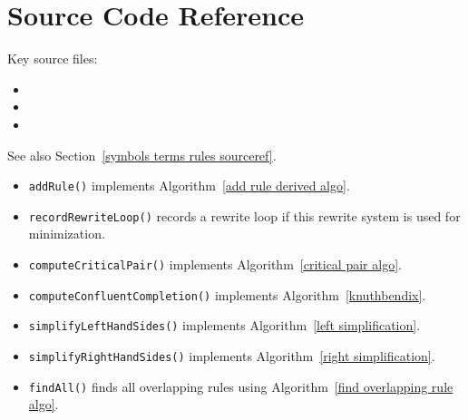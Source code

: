 \documentclass[../generics]{subfiles}
\begin{document}
\section{Source Code Reference}\label{completion sourceref}

Key source files:
\begin{itemize}
\item {}
\item {}
\item {}
\end{itemize}

See also Section~\ref{symbols terms rules sourceref}.
\begin{itemize}
\item \texttt{addRule()} implements Algorithm~\ref{add rule derived algo}.
\item \texttt{recordRewriteLoop()} records a rewrite loop if this rewrite system is used for minimization.
\item {}\texttt{computeCriticalPair()} implements Algorithm~\ref{critical pair algo}.
\item {}\texttt{computeConfluentCompletion()} implements Algorithm~\ref{knuthbendix}.
\item \texttt{simplifyLeftHandSides()} implements Algorithm~\ref{left simplification}.
\item \texttt{simplifyRightHandSides()} implements Algorithm~\ref{right simplification}.
\end{itemize}

\begin{itemize}
\item \texttt{findAll()} finds all overlapping rules using Algorithm~\ref{find overlapping rule algo}.
\end{itemize}
\end{document}
